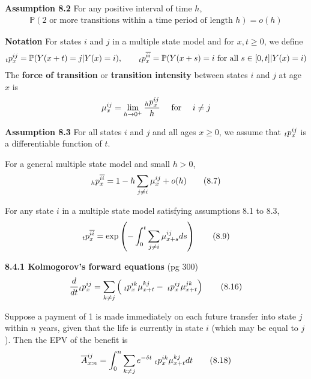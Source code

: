\documentclass[hidelinks, 12pt]{article}
\theoremstyle{mydefstyle}
\theoremstyle{mythmstyle}
\begin{document}
\textbf{Assumption 8.2} For any positive interval of time $h$, 
\begin{gather*} 
\mathbb{P}(\mbox{2 or more transitions within a time period of length $h$}) = o(h)
\end{gather*}

\textbf{Notation} For states $i$ and $j$ in a multiple state model and for $x, t \ge 0$, we define
\begin{gather*}
\hspace{0mm}_tp_x^{ij} = \mathbb{P}(Y(x+t) = j \vert Y(x) = i), \qquad
\hspace{0mm}_tp_x^{\overline{ii}} = \mathbb{P}(Y(x+s) = i \mbox{ for all } s\in [0, t] \vert Y(x) = i)
\end{gather*}
The \textbf{force of transition} or \textbf{transition intensity} between states $i$ and $j$ at age $x$ is
\begin{gather*}
\mu_x^{ij} = \lim_{h \to 0^+} \frac{\hspace{0mm}_hp_x^{ij}}{h} \quad\mbox{ for }\quad i \ne j
\end{gather*}

\textbf{Assumption 8.3} For all states $i$ and $j$ and all ages $x \ge 0$, we assume that $\hspace{0mm}_tp_x^{ij}$ is a differentiable function of $t$.

For a general multiple state model and small $h > 0$,
\begin{gather*}
\hspace{0mm}_hp_x^{\overline{ii}} = 1 - h \sum_{j \ne i} \mu_x^{ij} + o(h) \tag{8.7}
\end{gather*}

For any state $i$ in a multiple state model satisfying assumptions 8.1 to 8.3,
\begin{gather*}
\hspace{0mm}_tp_x^{\overline{ii}} = \exp \left( - \int_0^t \sum_{j \ne i} \mu_{x+s}^{ij} ds \right) \tag{8.9}
\end{gather*}

\textbf{8.4.1 Kolmogorov's forward equations} (pg 300)
\begin{gather*}
\frac{d}{dt} \hspace{0mm}_tp_x^{ij} = \sum_{k \ne j} \left( \hspace{1mm}_tp_x^{ik} \mu_{x+t}^{kj} - \hspace{1mm}_tp_x^{ij} \mu_{x+t}^{jk} \right) \tag{8.16}
\end{gather*}

Suppose a payment of 1 is made immediately on each future transfer into state $j$ within $n$ years, given that the life is currently in state $i$ (which may be equal to $j$). Then the EPV of the benefit is
\begin{gather*}
\overline{A}_{x:n}^{ij} = \int_0^n \sum_{k \ne j} e^{-\delta t} \hspace{1mm}_tp_x^{ik} \mu_{x+t}^{kj} dt \tag{8.18}
\end{gather*}
\end{document}
